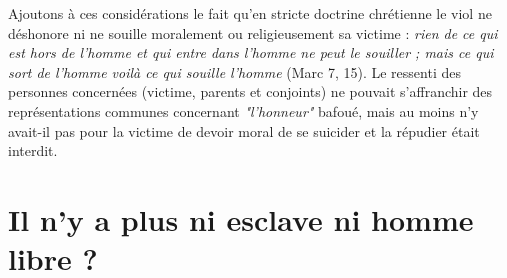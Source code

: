  Ajoutons à ces considérations le fait qu'en stricte doctrine chrétienne le viol ne déshonore ni ne souille moralement ou religieusement sa victime : \emph{rien de ce qui est hors de l'homme et qui entre dans l'homme ne peut le souiller ; mais ce qui sort de l'homme voilà ce qui souille l'homme} (Marc 7, 15).   Le ressenti des personnes concernées (victime, parents et conjoints) ne pouvait s'affranchir des représentations communes concernant \emph{"l'honneur"} bafoué, mais au moins n'y avait-il pas pour la victime de devoir moral de se suicider et la répudier était interdit.
 


\section{Il n'y a plus ni esclave ni homme libre ?}


